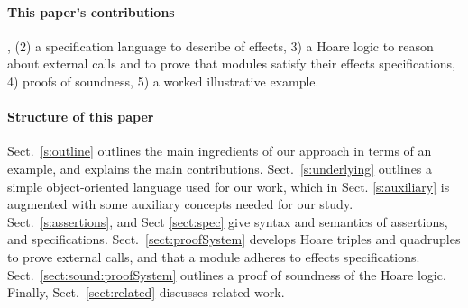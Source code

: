

\paragraph{This paper's contributions} %
, 
(2) a specification language to describe \taming of effects,
3) a Hoare logic to reason about external calls and to prove that modules satisfy their \tamed effects specifications,
4)  proofs of soundness,
5) a worked illustrative example.
 

 \paragraph{Structure of this paper}
Sect.\ \ref{s:outline}   outlines the main ingredients of our approach in terms of an example, and explains the main contributions.
Sect.\ \ref{s:underlying} outlines a simple object-oriented language used for our work, which in Sect. \ref{s:auxiliary} is augmented with some auxiliary concepts needed for our study.
Sect.\ \ref{s:assertions}, and Sect \ref{sect:spec}  give syntax and semantics of  assertions, and  specifications.
Sect.\ \ref{sect:proofSystem} develops Hoare triples and quadruples to prove external calls, and that a module adheres to \tamed effects specifications.
Sect.\ \ref{sect:sound:proofSystem} outlines a proof of soundness of
the Hoare logic. Finally, Sect.\ \ref{sect:related} discusses related
work. 
 
